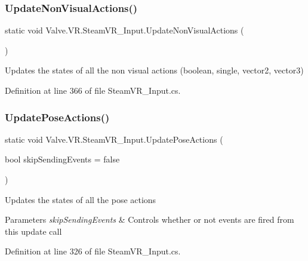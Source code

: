 \subsubsection{\texorpdfstring{UpdateNonVisualActions()}{UpdateNonVisualActions()}}
{\footnotesize\ttfamily static void Valve.\+V\+R.\+Steam\+V\+R\+\_\+\+Input.\+Update\+Non\+Visual\+Actions (\begin{DoxyParamCaption}{ }\end{DoxyParamCaption})\hspace{0.3cm}{\ttfamily [static]}}



Updates the states of all the non visual actions (boolean, single, vector2, vector3) 



Definition at line 366 of file Steam\+V\+R\+\_\+\+Input.\+cs.

\mbox{\label{class_valve_1_1_v_r_1_1_steam_v_r___input_a330caa435d2e10df76e907ac6bf05f84}} 
\subsubsection{\texorpdfstring{UpdatePoseActions()}{UpdatePoseActions()}}
{\footnotesize\ttfamily static void Valve.\+V\+R.\+Steam\+V\+R\+\_\+\+Input.\+Update\+Pose\+Actions (\begin{DoxyParamCaption}\item[{bool}]{skip\+Sending\+Events = {\ttfamily false} }\end{DoxyParamCaption})\hspace{0.3cm}{\ttfamily [static]}}



Updates the states of all the pose actions 


\begin{DoxyParams}{Parameters}
{\em skip\+Sending\+Events} & Controls whether or not events are fired from this update call\\
\hline
\end{DoxyParams}


Definition at line 326 of file Steam\+V\+R\+\_\+\+Input.\+cs.

\mbox{\label{class_valve_1_1_v_r_1_1_steam_v_r___input_a89a291058bb1162ddb8f2da57847bd7e}} 
